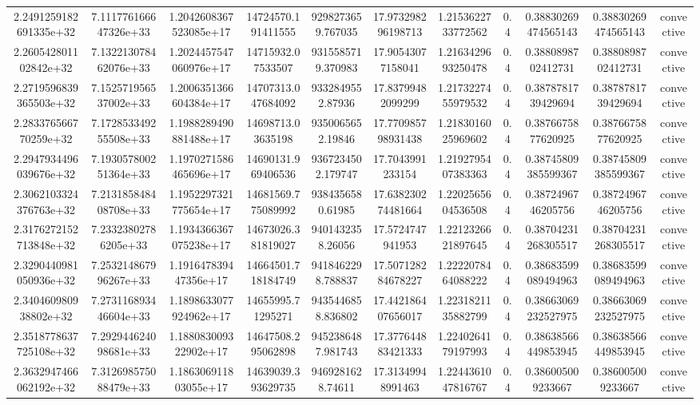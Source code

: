 \begin{table}
\begin{tabular}{ccccccccccc}
2.2491259182691335e+32 & 7.111776166647326e+33 & 1.2042608367523085e+17 & 14724570.191411555 & 9298273659.767035 & 17.973298296198713 & 1.2153622733772562 & 0.4 & 0.38830269474565143 & 0.38830269474565143 & convective \\
2.260542801102842e+32 & 7.132213078462076e+33 & 1.2024457547060976e+17 & 14715932.07533507 & 9315585719.370983 & 17.90543077158041 & 1.2163429693250478 & 0.4 & 0.3880898702412731 & 0.3880898702412731 & convective \\
2.2719596839365503e+32 & 7.152571956537002e+33 & 1.2006351366604384e+17 & 14707313.047684092 & 9332849552.87936 & 17.83799482099299 & 1.2173227455979532 & 0.4 & 0.3878781739429694 & 0.3878781739429694 & convective \\
2.283376566770259e+32 & 7.172853349255508e+33 & 1.1988289490881488e+17 & 14698713.03635198 & 9350065652.19846 & 17.770985798931438 & 1.2183016025969602 & 0.4 & 0.3876675877620925 & 0.3876675877620925 & convective \\
2.2947934496039676e+32 & 7.193057800251364e+33 & 1.1970271586465696e+17 & 14690131.969406536 & 9367234502.179747 & 17.7043991233154 & 1.2192795407383363 & 0.4 & 0.38745809385599367 & 0.38745809385599367 & convective \\
2.3062103324376763e+32 & 7.213185848408708e+33 & 1.1952297321775654e+17 & 14681569.775089992 & 9384356580.61985 & 17.638230274481664 & 1.2202565604536508 & 0.4 & 0.3872496746205756 & 0.3872496746205756 & convective \\
2.3176272152713848e+32 & 7.23323802786205e+33 & 1.1934366367075238e+17 & 14673026.381819027 & 9401432358.26056 & 17.5724747941953 & 1.2212326621897645 & 0.4 & 0.38704231268305517 & 0.38704231268305517 & convective \\
2.3290440981050936e+32 & 7.253214867996267e+33 & 1.191647839447356e+17 & 14664501.718184749 & 9418462298.788837 & 17.507128284678227 & 1.2222078464088222 & 0.4 & 0.38683599089494963 & 0.38683599089494963 & convective \\
2.340460980938802e+32 & 7.273116893446604e+33 & 1.1898633077924962e+17 & 14655995.71295271 & 9435446858.836802 & 17.442186407656017 & 1.2231821135882799 & 0.4 & 0.38663069232527975 & 0.38663069232527975 & convective \\
2.3518778637725108e+32 & 7.292944624098681e+33 & 1.188083009322902e+17 & 14647508.295062898 & 9452386487.981743 & 17.377644883421333 & 1.2240264179197993 & 0.4 & 0.38638566449853945 & 0.38638566449853945 & convective \\
2.3632947466062192e+32 & 7.312698575088479e+33 & 1.186306911803055e+17 & 14639039.393629735 & 9469281628.74611 & 17.31349948991463 & 1.2244361047816767 & 0.4 & 0.386005009233667 & 0.386005009233667 & convective \\

\end{tabular}
\end{table}
